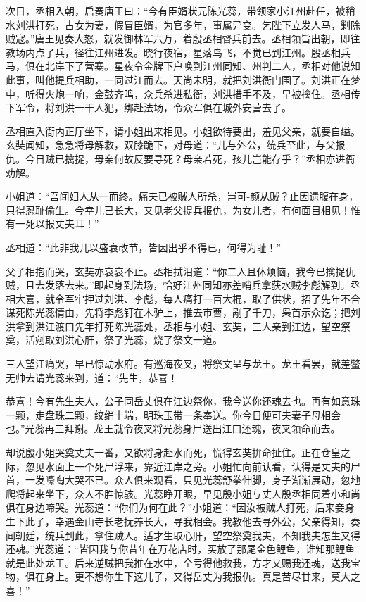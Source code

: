 \documentclass[12pt,UTF8]{ctexbook}
\begin{document}
{	次日，丞相入朝，启奏唐王曰：“今有臣婿状元陈光蕊，带领家小江州赴任，被稍水刘洪打死，占女为妻，假冒臣婿，为官多年，事属异变。乞陛下立发人马，剿除贼寇。”唐王见奏大怒，就发御林军六万，着殷丞相督兵前去。丞相领旨出朝，即往教场内点了兵，径往江州进发。晓行夜宿，星落鸟飞，不觉已到江州。殷丞相兵马，俱在北岸下了营寨。星夜令金牌下户唤到江州同知、州判二人，丞相对他说知此事，叫他提兵相助，一同过江而去。天尚未明，就把刘洪衙门围了。刘洪正在梦中，听得火炮一响，金鼓齐鸣，众兵杀进私衙，刘洪措手不及，早被擒住。丞相传下军令，将刘洪一干人犯，绑赴法场，令众军俱在城外安营去了。
	
	丞相直入衙内正厅坐下，请小姐出来相见。小姐欲待要出，羞见父亲，就要自缢。玄奘闻知，急急将母解救，双膝跪下，对母道：“儿与外公，统兵至此，与父报仇。今日贼已擒捉，母亲何故反要寻死？母亲若死，孩儿岂能存乎？”丞相亦进衙劝解。
	
	小姐道：“吾闻妇人从一而终。痛夫已被贼人所杀，岂可-颜从贼？止因遗腹在身，只得忍耻偷生。今幸儿已长大，又见老父提兵报仇，为女儿者，有何面目相见！惟有一死以报丈夫耳！”
	
	丞相道：“此非我儿以盛衰改节，皆因出乎不得已，何得为耻！”
	
	父子相抱而哭，玄奘亦哀哀不止。丞相拭泪道：“你二人且休烦恼，我今已擒捉仇贼，且去发落去来。”即起身到法场，恰好江州同知亦差哨兵拿获水贼李彪解到。丞相大喜，就令军牢押过刘洪、李彪，每人痛打一百大棍，取了供状，招了先年不合谋死陈光蕊情由，先将李彪钉在木驴上，推去市曹，剐了千刀，枭首示众讫；把刘洪拿到洪江渡口先年打死陈光蕊处，丞相与小姐、玄奘，三人亲到江边，望空祭奠，活剜取刘洪心肝，祭了光蕊，烧了祭文一道。
	
	三人望江痛哭，早已惊动水府。有巡海夜叉，将祭文呈与龙王。龙王看罢，就差鳖无帅去请光蕊来到，道：“先生，恭喜！
	
	恭喜！今有先生夫人，公子同岳丈俱在江边祭你，我今送你还魂去也。再有如意珠一颗，走盘珠二颗，绞绡十端，明珠玉带一条奉送。你今日便可夫妻子母相会也。”光蕊再三拜谢。龙王就令夜叉将光蕊身尸送出江口还魂，夜叉领命而去。
	
	却说殷小姐哭奠丈夫一番，又欲将身赴水而死，慌得玄奘拚命扯住。正在仓皇之际，忽见水面上一个死尸浮来，靠近江岸之旁。小姐忙向前认看，认得是丈夫的尸首，一发嚎啕大哭不已。众人俱来观看，只见光蕊舒拳伸脚，身子渐渐展动，忽地爬将起来坐下，众人不胜惊骇。光蕊睁开眼，早见殷小姐与丈人殷丞相同着小和尚俱在身边啼哭。光蕊道：“你们为何在此？”小姐道：“因汝被贼人打死，后来妾身生下此子，幸遇金山寺长老抚养长大，寻我相会。我教他去寻外公，父亲得知，奏闻朝廷，统兵到此，拿住贼人。适才生取心肝，望空祭奠我夫，不知我夫怎生又得还魂。”光蕊道：“皆因我与你昔年在万花店时，买放了那尾金色鲤鱼，谁知那鲤鱼就是此处龙王。后来逆贼把我推在水中，全亏得他救我，方才又赐我还魂，送我宝物，俱在身上。更不想你生下这儿子，又得岳丈为我报仇。真是苦尽甘来，莫大之喜！”
	
}
\end{document}
